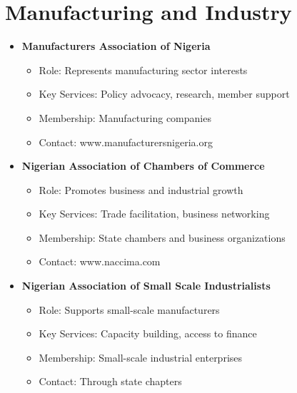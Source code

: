 \section{Manufacturing and Industry}\label{sec:manufacturing-associations}
\vspace{1em}

\begin{tcolorbox}[
    colback=white,
    colframe=primarydark,
    title=\textbf{Manufacturing Associations},
    before skip=1em,
    after skip=1em
]
    \begin{itemize}[leftmargin=*,itemsep=0.5em]
        \item \textbf{Manufacturers Association of Nigeria}
        \begin{itemize}[itemsep=0.3em]
            \item Role: Represents manufacturing sector interests
            \item Key Services: Policy advocacy, research, member support
            \item Membership: Manufacturing companies
            \item Contact: www.manufacturersnigeria.org
        \end{itemize}

        \vspace{0.5em}

        \item \textbf{Nigerian Association of Chambers of Commerce}
        \begin{itemize}[itemsep=0.3em]
            \item Role: Promotes business and industrial growth
            \item Key Services: Trade facilitation, business networking
            \item Membership: State chambers and business organizations
            \item Contact: www.naccima.com
        \end{itemize}

        \vspace{0.5em}

        \item \textbf{Nigerian Association of Small Scale Industrialists}
        \begin{itemize}[itemsep=0.3em]
            \item Role: Supports small-scale manufacturers
            \item Key Services: Capacity building, access to finance
            \item Membership: Small-scale industrial enterprises
            \item Contact: Through state chapters
        \end{itemize}
    \end{itemize}
\end{tcolorbox}

